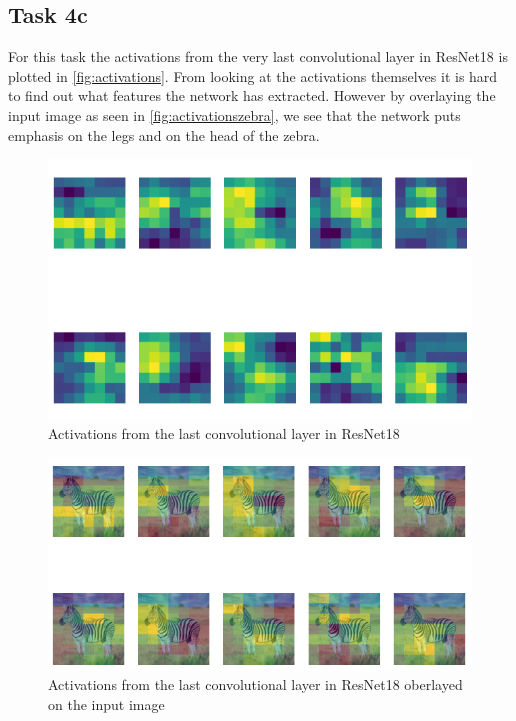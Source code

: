 \documentclass{article}
\begin{document}
\subsection{Task 4c}
For this task the activations from the very last convolutional layer in ResNet18 is plotted in \autoref{fig:activations}. From looking at the activations themselves it is hard to find out what features the network has extracted. However by overlaying the input image as seen in \autoref{fig:activationszebra}, we see that the network puts emphasis on the legs and on the head of the zebra. 
\begin{figure}[H]
    \centering
    \includegraphics[width=\textwidth]{Assignments/Assignment_3/plots/activationsc4c.png}
    \caption{Activations from the last convolutional layer in ResNet18}
    \label{fig:activations}
\end{figure}


\begin{figure}[H]
    \centering
    \includegraphics[width=\textwidth]{Assignments/Assignment_3/plots/activations4c_zebrac.png}
    \caption{Activations from the last convolutional layer in ResNet18 oberlayed on the input image}
    \label{fig:activationszebra}
\end{figure}



\end{document}
